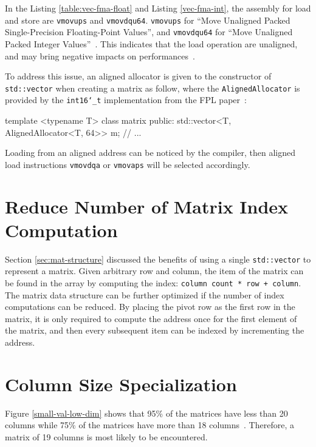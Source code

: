 \documentclass[logo,bsc,singlespacing,parskip]{infthesis}
\newcommand{\dtshort}{\texttt{int16\char`_t}}
\newenvironment{VerbatimCompact}
  {\vspace*{-2.5mm}\VerbatimEnvironment
   \par\Verbatim}
  {\endVerbatim\vspace*{-2.4mm}}
\begin{document}
In the Listing \ref{table:vec-fma-float} and Listing \ref{vec-fma-int}, the
assembly for load and store are \texttt{vmovups} and \texttt{vmovdqu64}.
\texttt{vmovups} for ``Move Unaligned Packed Single-Precision Floating-Point
Values'', and \texttt{vmovdqu64} for ``Move Unaligned Packed Integer
Values''~\cite{instruction}. This indicates that the load operation are unaligned,
and may bring negative impacts on performances~\cite{Unaligned}. 


To address this issue, an aligned allocator is given to the constructor of\linebreak
\texttt{std::vector} when creating a matrix as follow, where the
\texttt{AlignedAllocator} is provided by the \dtshort{} implementation from the
FPL paper~\cite{FPL2}:
\begin{VerbatimCompact}
template <typename T>
class matrix {
public:
  std::vector<T, AlignedAllocator<T, 64>> m;
  // ...
}
\end{VerbatimCompact}

Loading from an aligned address can be noticed by the compiler, then aligned
load instructions \texttt{vmovdqa} or \texttt{vmovaps} will be selected
accordingly. 

\section{Reduce Number of Matrix Index Computation}
\label{sec:optmz-get-index}

Section \ref{sec:mat-structure} discussed the benefits of using a single
\texttt{std::vector} to represent a matrix. Given arbitrary row and column, the
item of the matrix can be found in the array by computing the index:
\texttt{column count * row + column}. The matrix data structure can be further
optimized if the number of index computations can be reduced. By placing the
pivot row as the first row in the matrix, it is only required to compute the
address once for the first element of the matrix, and then every subsequent item
can be indexed by incrementing the address. 




\section{Column Size Specialization}
\label{sec:ColumnSizeSpecialization}
Figure \ref{small-val-low-dim} shows that 95\% of the matrices have less
than 20 columns while 75\% of the matrices have more than 18
columns~\cite{FPL1}. Therefore, a matrix of 19 columns is most likely to be encountered. 
\end{document}
